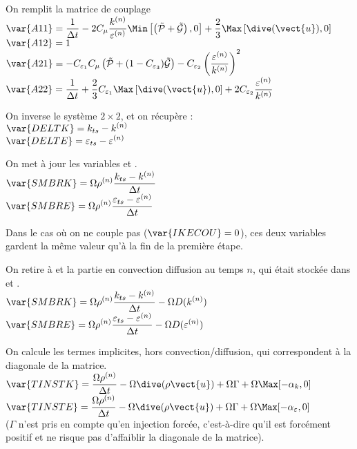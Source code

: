 On remplit la matrice de couplage\\
$\displaystyle \var{A11}=\frac{1}{\Delta t}
-2 C_\mu\frac{k^{(n)}}{\varepsilon^{(n)}}
\Min\left[\left(\tilde{\mathcal{P}}+\tilde{\mathcal{G}}\right),0\right]
+\frac{2}{3}\Max\left[\dive(\vect{u}),0\right]$\\
$\displaystyle \var{A12}= 1$\\
$\displaystyle \var{A21}=
- C_{\varepsilon_1} C_\mu \left(\tilde{\mathcal{P}}
+(1-C_{\varepsilon_3})\tilde{\mathcal{G}}\right)
- C_{\varepsilon_2}\left(\frac{\varepsilon^{(n)}}{k^{(n)}}\right)^2$\\
$\displaystyle \var{A22}=\frac{1}{\Delta t}
+\frac{2}{3}C_{\varepsilon_1}\Max\left[\dive(\vect{u}),0\right]
+2 C_{\varepsilon_2}\frac{\varepsilon^{(n)}}{k^{(n)}}$

On inverse le syst\`eme $2\times 2$, et on r\'ecup\`ere :\\
$\displaystyle \var{DELTK}=k_{ts}-k^{(n)}$\\
$\displaystyle \var{DELTE}=\varepsilon_{ts}-\varepsilon^{(n)}$

On met \`a jour les variables  et .\\
$\displaystyle \var{SMBRK}=\Omega \rho^{(n)}\frac{k_{ts}-k^{(n)}}{\Delta t}$\\
$\displaystyle \var{SMBRE}=
\Omega \rho^{(n)}\frac{\varepsilon_{ts}-\varepsilon^{(n)}}{\Delta t}$

Dans le cas o\`u on ne couple pas ($\var{IKECOU}=0$), ces deux variables gardent
la m\^eme valeur qu'\`a la fin de la premi\`ere \'etape.

On retire \`a  et  la partie en convection diffusion au
temps $n$, qui \'etait stock\'ee dans  et .\\
$\displaystyle \var{SMBRK}=\Omega \rho^{(n)}\frac{k_{ts}-k^{(n)}}{\Delta t}
-\Omega D(k^{(n)})$\\
$\displaystyle \var{SMBRE}=
\Omega \rho^{(n)}\frac{\varepsilon_{ts}-\varepsilon^{(n)}}{\Delta t}
-\Omega D(\varepsilon^{(n)})$


On calcule les termes implicites, hors convection/diffusion, qui correspondent
\`a la diagonale de la matrice.\\
$\displaystyle \var{TINSTK}=\frac{\Omega \rho^{(n)}}{\Delta t}
-\Omega\dive(\rho\vect{u})+\Omega\Gamma+\Omega\Max[-\alpha_k,0]$\\
$\displaystyle \var{TINSTE}=\frac{\Omega \rho^{(n)}}{\Delta t}
-\Omega\dive(\rho\vect{u})+\Omega\Gamma+\Omega\Max[-\alpha_\varepsilon,0]$\\
($\Gamma$ n'est pris en compte qu'en injection forc\'ee, c'est-\`a-dire qu'il
est forc\'ement positif et ne risque pas d'affaiblir la diagonale de la matrice).

